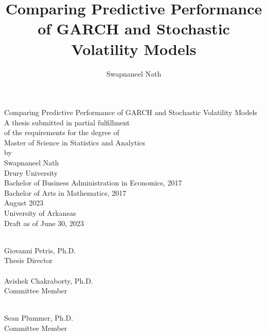\documentclass[12pt,letterpaper,reqno,fleqn]{article}
\author{Swapnaneel Nath}
\begin{document}
\title{Comparing Predictive Performance of GARCH and Stochastic Volatility Models}
\thispagestyle{empty}
\begin{singlespace}
\begin{center}
	{Comparing Predictive Performance of GARCH and Stochastic Volatility Models} \\
	\vspace{0.5in}
	A thesis submitted in partial fulfillment\\
	of the requirements for the degree of\\
	{Master of Science in Statistics and Analytics}\\
	\vspace{0.5in}
	by\\
	\vspace{0.5in}
	{Swapnaneel Nath}\\
	Drury University\\
        Bachelor of Business Administration in Economics, 2017\\
	Bachelor of Arts in Mathematics, 2017\\
	\vspace{0.5in}
	August 2023\\
	University of Arkansas\\
	\vspace{0.5in}
	Draft as of June 30, 2023
	\end{center}
\begin{flushleft}
\vspace{0.75in}


\vspace{0.75in}
\begin{minipage}[b]{0.48\textwidth}
\makebox[\textwidth]{\hrulefill}\\
Giovanni Petris, Ph.D.\\
Thesis Director\\[0.5in]
\makebox[\textwidth]{\hrulefill}\\
Avishek Chakraborty, Ph.D.\\
Committee Member\\[0.5in]
\end{minipage}
\hfill
\begin{minipage}[b]{0.48\textwidth}
\makebox[\textwidth]{\hrulefill}\\
Sean Plummer, Ph.D.\\
Committee Member\\[0.5in]
\end{minipage}
\end{flushleft}
\end{singlespace}
\end{document}
